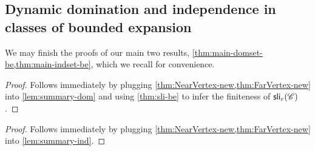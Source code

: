 \subsection{Dynamic domination and independence in classes of bounded expansion}

We may finish the proofs of our main two results, \cref{thm:main-domset-be,thm:main-indset-be}, which we recall for convenience.

\mainDomBE*
\begin{proof}
	Follows immediately by plugging \cref{thm:NearVertex-new,thm:FarVertex-new} into \cref{lem:summary-dom} and using \cref{thm:sli-be} to infer the finiteness of $\mathsf{sli}_r(\mathscr C)$.
\end{proof}

\mainIndBE*
\begin{proof}
	Follows immediately by plugging \cref{thm:NearVertex-new,thm:FarVertex-new} into \cref{lem:summary-ind}.
\end{proof}
